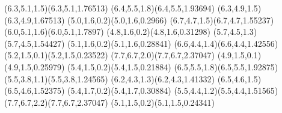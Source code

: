 \pstThreeDLine[linecolor=gray](6.3,5.1,1.5)(6.3,5.1,1.76513)
\pstThreeDLine[linecolor=gray](6.4,5.5,1.8)(6.4,5.5,1.93694)
\pstThreeDLine[linecolor=gray](6.3,4.9,1.5)(6.3,4.9,1.67513)
\pstThreeDLine[linecolor=gray](5.0,1.6,0.2)(5.0,1.6,0.2966)
\pstThreeDLine[linecolor=gray](6.7,4.7,1.5)(6.7,4.7,1.55237)
\pstThreeDLine[linecolor=gray](6.0,5.1,1.6)(6.0,5.1,1.7897)
\pstThreeDLine[linecolor=gray](4.8,1.6,0.2)(4.8,1.6,0.31298)
\pstThreeDLine[linecolor=gray](5.7,4.5,1.3)(5.7,4.5,1.54427)
\pstThreeDLine[linecolor=gray](5.1,1.6,0.2)(5.1,1.6,0.28841)
\pstThreeDLine[linecolor=gray](6.6,4.4,1.4)(6.6,4.4,1.42556)
\pstThreeDLine[linecolor=gray](5.2,1.5,0.1)(5.2,1.5,0.23522)
\pstThreeDLine[linecolor=gray](7.7,6.7,2.0)(7.7,6.7,2.37047)
\pstThreeDLine[linecolor=gray](4.9,1.5,0.1)(4.9,1.5,0.25979)
\pstThreeDLine[linecolor=gray](5.4,1.5,0.2)(5.4,1.5,0.21884)
\pstThreeDLine[linecolor=gray](6.5,5.5,1.8)(6.5,5.5,1.92875)
\pstThreeDLine[linecolor=gray](5.5,3.8,1.1)(5.5,3.8,1.24565)
\pstThreeDLine[linecolor=gray](6.2,4.3,1.3)(6.2,4.3,1.41332)
\pstThreeDLine[linecolor=gray](6.5,4.6,1.5)(6.5,4.6,1.52375)
\pstThreeDLine[linecolor=gray](5.4,1.7,0.2)(5.4,1.7,0.30884)
\pstThreeDLine[linecolor=gray](5.5,4.4,1.2)(5.5,4.4,1.51565)
\pstThreeDLine[linecolor=gray](7.7,6.7,2.2)(7.7,6.7,2.37047)
\pstThreeDLine[linecolor=gray](5.1,1.5,0.2)(5.1,1.5,0.24341)
